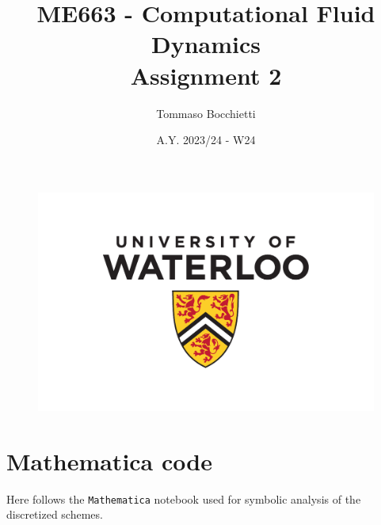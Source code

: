 \documentclass{assignment}
\begin{document}
\title{ME663 - Computational Fluid Dynamics \\ Assignment 2}
\author{Tommaso Bocchietti}
\date{A.Y. 2023/24 - W24}

\maketitle

\begin{figure}[H]
    \centering
    \includegraphics[width=.9\textwidth]{./pdf/UniversityOfWaterloo_logo_vert_pms}
    \label{fig:University_Of_Waterloo_logo}
\end{figure}

\clearpage
\tableofcontents
\listoffigures
\listoftables
\lstlistoflistings
\printglossary[type=\acronymtype]

\clearpage








\clearpage



\clearpage
\appendix
\label{sec:appendix}

\section{Mathematica code}

Here follows the \texttt{Mathematica} notebook used for symbolic analysis of the discretized schemes.

% 
\end{document}

